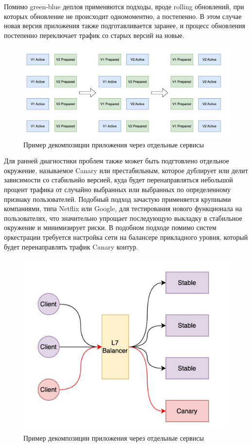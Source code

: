 Помимо green-blue деплоя применяются подходы, вроде rolling обновлений, при которых обновление не происходит
одномоментно, а постепенно. В этом случае новая версия приложения также подготавливается заранее, и процесс обновления
постепенно переключает трафик со старых версий на новые.

\begin{figure}[H]
    \centering
    \includegraphics[width=0.8\linewidth]{img/rolling.jpg}
    \caption{Пример декомпозиции приложения через отдельные сервисы}
    \label{fig:y}
\end{figure}

Для ранней диагностики проблем также может быть подгтовлено отдельное окружение, называемое Canary или престабильным, которое дублирует или делит 
зависимости со стабильнйо версией, куда будет перенаправляться небольшой процент трафика от случайно выбранных или выбранных
по определенному признаку пользователей. Подобный подход зачастую применяется крупными компаниями, типа Netflix или Google, для
тестирования нового функционала на пользователях, что значительно упрощает последующую выкладку в стабильное окружение
и минимизирует риски. В подобном подходе помимо систем оркестрации требуется настройка 
сети на балансере прикладного уровня, который будет перенаправлять трафик Canary контур. 

\begin{figure}[H]
    \centering
    \includegraphics[width=0.8\linewidth]{img/canary.jpg}
    \caption{Пример декомпозиции приложения через отдельные сервисы}
    \label{fig:y}
\end{figure}

